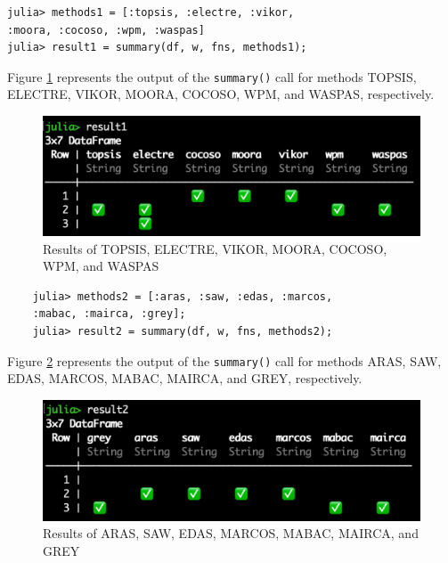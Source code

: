 \documentclass[authoryear,preprint,review,12pt]{elsarticle}
\begin{document}
\begin{verbatim}
julia> methods1 = [:topsis, :electre, :vikor, 
:moora, :cocoso, :wpm, :waspas]
julia> result1 = summary(df, w, fns, methods1);
\end{verbatim}

Figure \ref{fig:imagea} represents the output of the \texttt{summary()} call for methods TOPSIS, ELECTRE, VIKOR, MOORA, COCOSO, WPM,  and WASPAS, respectively.

\begin{figure}
	\includegraphics[width=\columnwidth]{images/result1}
	\caption{Results of TOPSIS, ELECTRE, VIKOR, MOORA, COCOSO, WPM, and WASPAS}
	\label{fig:imagea}
	\end{figure}

\begin{verbatim}
	julia> methods2 = [:aras, :saw, :edas, :marcos, 
	:mabac, :mairca, :grey];
	julia> result2 = summary(df, w, fns, methods2);
\end{verbatim}

Figure \ref{fig:imageb} represents the output of the \texttt{summary()} call for methods ARAS, SAW, EDAS, MARCOS, MABAC, MAIRCA, and GREY, respectively.


	\begin{figure}
		\includegraphics[width=\columnwidth]{images/result2}
		\caption{Results of ARAS, SAW, EDAS, MARCOS, MABAC, MAIRCA, and GREY}
		\label{fig:imageb}
		\end{figure}

\end{document}
